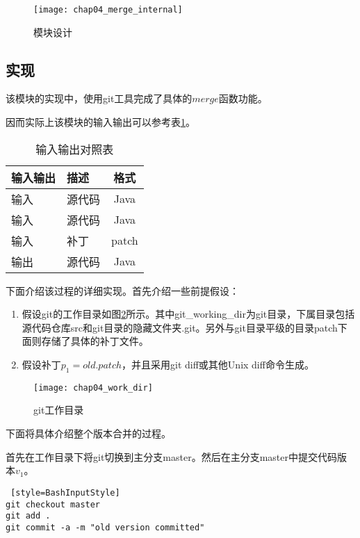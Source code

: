 \begin{figure}[H]
	\centering
	\texttt{[image: chap04\_merge\_internal]}
	\caption {模块设计}
	\label {merge_des}	
\end{figure}

\subsection{实现}

该模块的实现中，使用git工具完成了具体的$merge$函数功能。

因而实际上该模块的输入输出可以参考表\ref {version_io2}。

\begin{table}
	\caption{输入输出对照表}
	\label{version_io2}
	\centering
	\begin{tabular}{llc}
		\toprule[1.5pt]
		{\heiti 输入输出} & {\heiti 描述} & {\heiti 格式}\\\midrule[1pt]
		输入 & 源代码 & Java\\
		输入 & 源代码 & Java\\
		输入 & 补丁 & patch\\
		输出 & 源代码 & Java\\
		\bottomrule[1.5pt]
	\end{tabular}
\end{table}


下面介绍该过程的详细实现。首先介绍一些前提假设：

\begin{enumerate}
	\item 假设git的工作目录如图\ref {git_work_dir}所示。其中git\_working\_dir为git目录，下属目录包括源代码仓库src和git目录的隐藏文件夹.git。另外与git目录平级的目录patch下面则存储了具体的补丁文件。

	\item 假设补丁$p_1 = old.patch$，并且采用git diff或其他Unix diff命令生成。
\end{enumerate}

\begin{figure}[H]
	\centering
	\texttt{[image: chap04\_work\_dir]}
	\caption {git工作目录}
	\label {git_work_dir}	
\end{figure}

下面将具体介绍整个版本合并的过程。


首先在工作目录下将git切换到主分支master。然后在主分支master中提交代码版本$v_1$。

\begin{lstlisting} [style=BashInputStyle]
git checkout master
git add .
git commit -a -m "old version committed"
\end{lstlisting}


